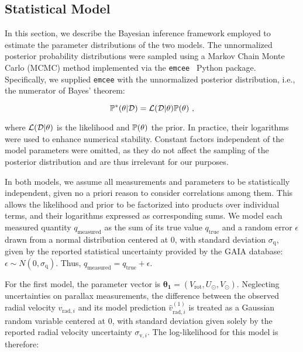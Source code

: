 \subsection{Statistical Model}\label{subsec:StatisticalModel}

In this section, we describe the Bayesian inference framework employed to estimate the parameter distributions of the two models. The unnormalized posterior probability distributions were sampled using a Markov Chain Monte Carlo (MCMC) method implemented via the \texttt{emcee}~\cite{EMCEE} Python package. Specifically, we supplied \texttt{emcee} with the unnormalized posterior distribution, i.e., the numerator of Bayes' theorem:

\begin{equation}\label{Eq:NonNormPosterior}
    \mathbb{P}^{*}(\theta \vert \mathcal{D}) = \mathcal{L}(\mathcal{D} \vert \theta) \mathbb{P}(\theta) \text{ ,}
\end{equation}

\noindent where $\mathcal{L}(\mathcal{D} \vert \theta)$ is the likelihood and $\mathbb{P}(\theta)$ the prior. In practice, their logarithms were used to enhance numerical stability. Constant factors independent of the model parameters were omitted, as they do not affect the sampling of the posterior distribution and are thus irrelevant for our purposes.

In both models, we assume all measurements and parameters to be statistically independent, given no a priori reason to consider correlations among them. This allows the likelihood and prior to be factorized into products over individual terms, and their logarithms expressed as corresponding sums. We model each measured quantity $q_{\text{measured}}$ as the sum of its true value $q_{\text{true}}$ and a random error $\epsilon$ drawn from a normal distribution centered at 0, with standard deviation $\sigma_{\text{q}}$, given by the reported statistical uncertainty provided by the GAIA database: $\epsilon \sim N(0, \sigma_\text{q})$. Thus, $q_{\text{measured}} = q_{\text{true}} + \epsilon$.

For the first model, the parameter vector is $\mathbf{\theta_1} = (V_{\text{rot}}, U_{\odot}, V_{\odot})$. Neglecting uncertainties on parallax measurements, the difference between the observed radial velocity $v_{\text{rad}, i}$ and its model prediction $\hat{v}^{(1)}_{\text{rad}, i}$ is treated as a Gaussian random variable centered at 0, with standard deviation given solely by the reported radial velocity uncertainty $\sigma_{\text{v},i}$. The log-likelihood for this model is therefore:

